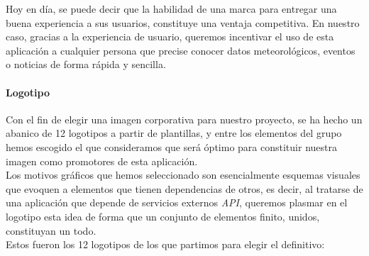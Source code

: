 \documentclass[../ei103948-project-documentation.tex]{subfiles}
\begin{document}
                            Hoy en día, se puede decir que la habilidad de una marca para entregar una buena experiencia a sus usuarios, constituye una ventaja competitiva. En nuestro caso, gracias a la experiencia de usuario, queremos incentivar el uso de esta aplicación a cualquier persona que precise conocer datos meteorológicos, eventos o noticias de forma rápida y sencilla.
                    
                            \paragraph{Logotipo}
                            Con el fin de elegir una imagen corporativa para nuestro proyecto, se ha hecho un abanico de 12 logotipos a partir de plantillas, y entre los elementos del grupo hemos escogido el que consideramos que será óptimo para constituir nuestra imagen como promotores de esta aplicación. \\
                            
                            Los motivos gráficos que hemos seleccionado son esencialmente esquemas visuales que evoquen a elementos que tienen dependencias de otros, es decir, al tratarse de una aplicación que depende de servicios externos \textit{API}, queremos plasmar en el logotipo esta idea de forma que un conjunto de elementos finito, unidos, constituyan un todo.\\
                    
                            Estos fueron los 12 logotipos de los que partimos para elegir el definitivo:
                    
\end{document}
